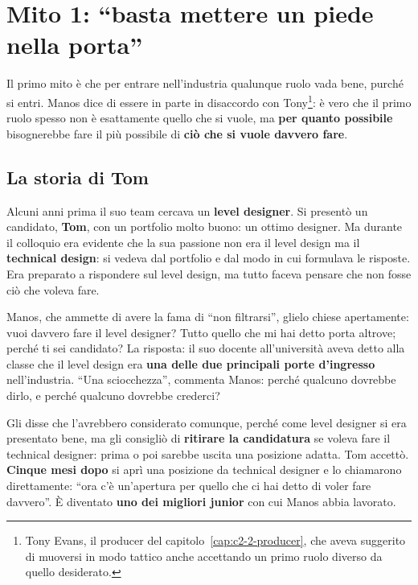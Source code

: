 \section{Mito 1: ``basta mettere un piede nella porta''}
\label{sec:c2-6-mito1}

Il primo mito è che per entrare nell'industria qualunque ruolo vada bene, purché
si entri. Manos dice di essere in parte in disaccordo con
Tony\footnote{Tony Evans, il producer del capitolo~\ref{cap:c2-2-producer}, che
aveva suggerito di muoversi in modo tattico anche accettando un primo ruolo
diverso da quello desiderato.}: è vero che il primo ruolo spesso non è esattamente
quello che si vuole, ma \textbf{per quanto possibile} bisognerebbe fare il più
possibile di \textbf{ciò che si vuole davvero fare}.

\subsection{La storia di Tom}

Alcuni anni prima il suo team cercava un \textbf{level designer}. Si presentò un
candidato, \textbf{Tom}, con un portfolio molto buono: un ottimo designer. Ma
durante il colloquio era evidente che la sua passione non era il level design ma il
\textbf{technical design}: si vedeva dal portfolio e dal modo in cui formulava le
risposte. Era preparato a rispondere sul level design, ma tutto faceva pensare che
non fosse ciò che voleva fare.

Manos, che ammette di avere la fama di ``non filtrarsi'', glielo chiese
apertamente: vuoi davvero fare il level designer? Tutto quello che mi hai detto
porta altrove; perché ti sei candidato? La risposta: il suo docente all'università
aveva detto alla classe che il level design era \textbf{una delle due principali
porte d'ingresso} nell'industria. ``Una sciocchezza'', commenta Manos: perché
qualcuno dovrebbe dirlo, e perché qualcuno dovrebbe crederci?

Gli disse che l'avrebbero considerato comunque, perché come level designer si era
presentato bene, ma gli consigliò di \textbf{ritirare la candidatura} se voleva
fare il technical designer: prima o poi sarebbe uscita una posizione adatta. Tom
accettò. \textbf{Cinque mesi dopo} si aprì una posizione da technical designer e lo
chiamarono direttamente: ``ora c'è un'apertura per quello che ci hai detto di voler
fare davvero''. È diventato \textbf{uno dei migliori junior} con cui Manos abbia
lavorato.

